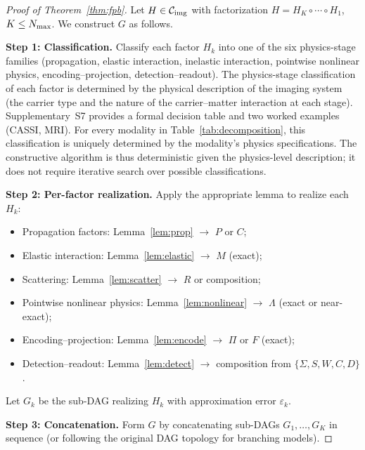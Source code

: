 \documentclass[11pt]{article}
\begin{document}
\begin{proof}[Proof of Theorem~\ref{thm:fpb}]
Let $H \in \mathcal{C}_{\mathrm{img}}$ with factorization $H = H_K \circ \cdots \circ H_1$, $K \leq N_{\max}$. We construct $G$ as follows.

\textbf{Step 1: Classification.} Classify each factor $H_k$ into one of the six physics-stage families (propagation, elastic interaction, inelastic interaction, pointwise nonlinear physics, encoding--projection, detection--readout). The physics-stage classification of each factor is determined by the physical description of the imaging system (the carrier type and the nature of the carrier--matter interaction at each stage). Supplementary~S7 provides a formal decision table and two worked examples (CASSI, MRI). For every modality in Table~\ref{tab:decomposition}, this classification is uniquely determined by the modality's physics specifications. The constructive algorithm is thus deterministic given the physics-level description; it does not require iterative search over possible classifications.

\textbf{Step 2: Per-factor realization.} Apply the appropriate lemma to realize each $H_k$:
\begin{itemize}
  \item Propagation factors: Lemma~\ref{lem:prop} $\to$ $P$ or $C$;
  \item Elastic interaction: Lemma~\ref{lem:elastic} $\to$ $M$ (exact);
  \item Scattering: Lemma~\ref{lem:scatter} $\to$ $R$ or composition;
  \item Pointwise nonlinear physics: Lemma~\ref{lem:nonlinear} $\to$ $\Lambda$ (exact or near-exact);
  \item Encoding--projection: Lemma~\ref{lem:encode} $\to$ $\Pi$ or $F$ (exact);
  \item Detection--readout: Lemma~\ref{lem:detect} $\to$ composition from $\{\Sigma, S, W, C, D\}$.
\end{itemize}
Let $G_k$ be the sub-DAG realizing $H_k$ with approximation error $\varepsilon_k$.

\textbf{Step 3: Concatenation.} Form $G$ by concatenating sub-DAGs $G_1, \ldots, G_K$ in sequence (or following the original DAG topology for branching models).


\end{proof}
\end{document}
